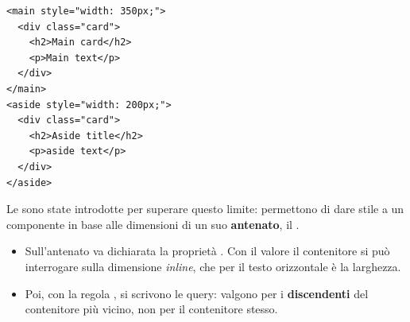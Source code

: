 \begin{affianco}[0.44][c]
\begin{lstlisting}[style=html, name=pagina.html]
<main style="width: 350px;">
  <div class="card">
    <h2>Main card</h2>
    <p>Main text</p>
  </div>
</main>
<aside style="width: 200px;">
  <div class="card">
    <h2>Aside title</h2>
    <p>aside text</p>
  </div>
</aside>
\end{lstlisting}
\risultato
\begin{browser}
\end{browser}
\end{affianco}

Le  sono state introdotte per superare questo limite:
permettono di dare stile a un componente in base alle dimensioni di un suo
\textbf{antenato}, il .

\begin{itemize}
  \item Sull'antenato va dichiarata la proprietà . Con il
        valore  il contenitore si può interrogare sulla
        dimensione \textit{inline}, che per il testo orizzontale è la
        larghezza.
  \item Poi, con la regola , si scrivono le query: valgono per
        i \textbf{discendenti} del contenitore più vicino, non per il
        contenitore stesso.
\end{itemize}

